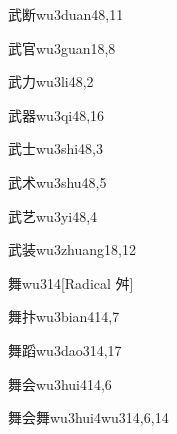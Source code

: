 \begin{entry}{武断}{wu3duan4}{8,11}
\end{entry}

\begin{entry}{武官}{wu3guan1}{8,8}
\end{entry}

\begin{entry}{武力}{wu3li4}{8,2}
\end{entry}

\begin{entry}{武器}{wu3qi4}{8,16}
\end{entry}

\begin{entry}{武士}{wu3shi4}{8,3}
\end{entry}

\begin{entry}{武术}{wu3shu4}{8,5}
\end{entry}

\begin{entry}{武艺}{wu3yi4}{8,4}
\end{entry}

\begin{entry}{武装}{wu3zhuang1}{8,12}
\end{entry}

\begin{entry}{舞}{wu3}{14}[Radical 舛]
\end{entry}

\begin{entry}{舞抃}{wu3bian4}{14,7}
\end{entry}

\begin{entry}{舞蹈}{wu3dao3}{14,17}
\end{entry}

\begin{entry}{舞会}{wu3hui4}{14,6}
\end{entry}

\begin{entry}{舞会舞}{wu3hui4wu3}{14,6,14}
\end{entry}

